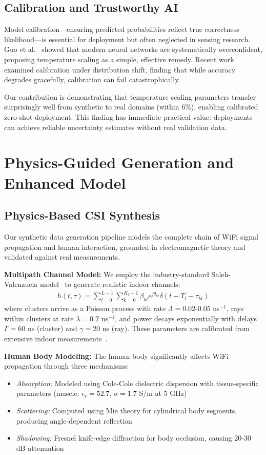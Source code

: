 \documentclass[journal]{IEEEtran}
\begin{document}
\subsection{Calibration and Trustworthy AI}
Model calibration—ensuring predicted probabilities reflect true correctness likelihood—is essential for deployment but often neglected in sensing research. Guo et al.~\cite{calibration_guo2017} showed that modern neural networks are systematically overconfident, proposing temperature scaling as a simple, effective remedy. Recent work~\cite{ovadia2019trust} examined calibration under distribution shift, finding that while accuracy degrades gracefully, calibration can fail catastrophically.

Our contribution is demonstrating that temperature scaling parameters transfer surprisingly well from synthetic to real domains (within 6\%), enabling calibrated zero-shot deployment. This finding has immediate practical value: deployments can achieve reliable uncertainty estimates without real validation data.

\section{Physics-Guided Generation and Enhanced Model}

\subsection{Physics-Based CSI Synthesis}
Our synthetic data generation pipeline models the complete chain of WiFi signal propagation and human interaction, grounded in electromagnetic theory and validated against real measurements.

\textbf{Multipath Channel Model:} We employ the industry-standard Saleh-Valenzuela model~\cite{saleh1987statistical} to generate realistic indoor channels:
\begin{align}
h(t,\tau) = \sum_{l=0}^{L-1} \sum_{k=0}^{K_l-1} \beta_{kl} e^{j\theta_{kl}} \delta(t - T_l - \tau_{kl})
\end{align}
where clusters arrive as a Poisson process with rate $\Lambda = 0.02\text{-}0.05$ ns$^{-1}$, rays within clusters at rate $\lambda = 0.2$ ns$^{-1}$, and power decays exponentially with delays $\Gamma = 60$ ns (cluster) and $\gamma = 20$ ns (ray). These parameters are calibrated from extensive indoor measurements~\cite{goldsmith2005wireless}.

\textbf{Human Body Modeling:} The human body significantly affects WiFi propagation through three mechanisms:
\begin{itemize}
\item \textit{Absorption:} Modeled using Cole-Cole dielectric dispersion with tissue-specific parameters (muscle: $\epsilon_r = 52.7$, $\sigma = 1.7$ S/m at 5 GHz)
\item \textit{Scattering:} Computed using Mie theory for cylindrical body segments, producing angle-dependent reflection
\item \textit{Shadowing:} Fresnel knife-edge diffraction for body occlusion, causing 20-30 dB attenuation
\end{itemize}
\end{document}
